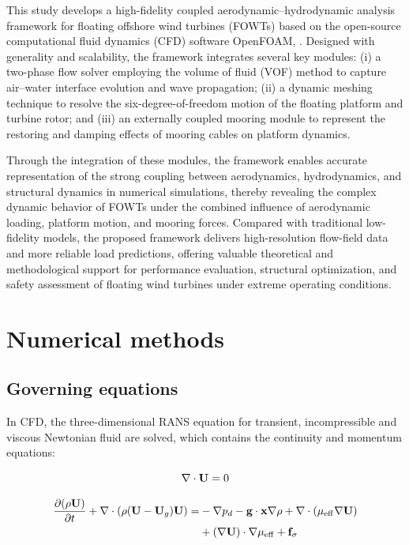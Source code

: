\documentclass[%
 aip,
 amsmath,amssymb,
 reprint,%
]{revtex4-1}
\begin{document}
This study develops a high-fidelity coupled aerodynamic–hydrodynamic analysis framework for floating offshore wind turbines (FOWTs) based on the open-source computational fluid dynamics (CFD) software OpenFOAM, . Designed with generality and scalability, the framework integrates several key modules: (i) a two-phase flow solver employing the volume of fluid (VOF) method to capture air–water interface evolution and wave propagation; (ii) a dynamic meshing technique to resolve the six-degree-of-freedom motion of the floating platform and turbine rotor; and (iii) an externally coupled mooring module to represent the restoring and damping effects of mooring cables on platform dynamics.

Through the integration of these modules, the framework enables accurate representation of the strong coupling between aerodynamics, hydrodynamics, and structural dynamics in numerical simulations, thereby revealing the complex dynamic behavior of FOWTs under the combined influence of aerodynamic loading, platform motion, and mooring forces. Compared with traditional low-fidelity models, the proposed framework delivers high-resolution flow-field data and more reliable load predictions, offering valuable theoretical and methodological support for performance evaluation, structural optimization, and safety assessment of floating wind turbines under extreme operating conditions.


\section{Numerical methods} \label{sec:Methodology}


\subsection{Governing equations}
In CFD, the three-dimensional RANS equation for transient, incompressible and viscous Newtonian fluid are solved, which contains the continuity and momentum equations:

\begin{equation}
\nabla  \cdot {\bf{U}} = 0
\label{con:rewardinDRL}
\end{equation}

\begin{equation}
\begin{split}
\frac{\partial (\rho \mathbf{U})}{\partial t} 
+ \nabla \cdot \left( \rho (\mathbf{U} - \mathbf{U}_g)\mathbf{U} \right) 
= & - \nabla p_d - {\bf{g}} \cdot {\bf{x}}\nabla \rho + \nabla \cdot (\mu_{\mathrm{eff}} \nabla \mathbf{U})\\
&  + (\nabla {\bf{U}}) \cdot \nabla {\mu _{{\rm{eff}}}} + \mathbf{f}_\sigma
\end{split}
\label{con:rewardinDRL}
\end{equation}
\end{document}
